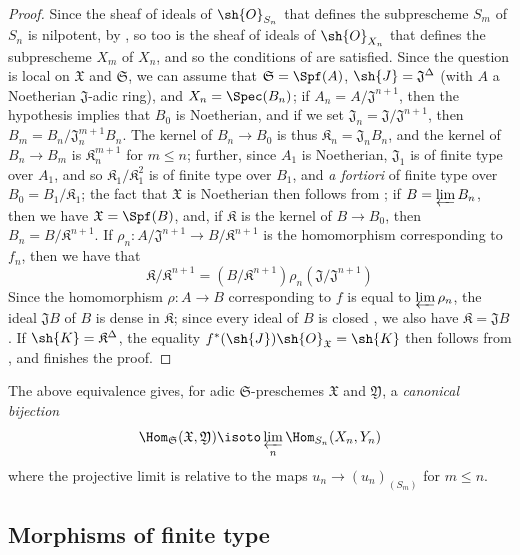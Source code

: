\begin{proof}
Since the sheaf of ideals of $\sh{O}_{S_n}$ that defines the subprescheme $S_m$ of $S_n$ is nilpotent, by , so too is the sheaf of ideals of $\sh{O}_{X_n}$ that defines the subprescheme $X_m$ of $X_n$, and so the conditions of  are satisfied.
Since the question is local on $\mathfrak{X}$ and $\mathfrak{S}$, we can assume that $\mathfrak{S}=\Spf(A)$, $\sh{J}=\mathfrak{J}^\Delta$ (with $A$ a Noetherian $\mathfrak{J}$-adic ring), and $X_n=\Spec(B_n)$;
if $A_n=A/\mathfrak{J}^{n+1}$, then the hypothesis implies that $B_0$ is Noetherian, and if we set $\mathfrak{J}_n=\mathfrak{J}/\mathfrak{J}^{n+1}$, then $B_m=B_n/\mathfrak{J}_n^{m+1}B_n$.
The kernel of $B_n\to B_0$ is thus $\mathfrak{K}_n=\mathfrak{J}_nB_n$, and the kernel of $B_n\to B_m$ is $\mathfrak{K}_n^{m+1}$ for $m\leq n$;
further, since $A_1$ is Noetherian, $\mathfrak{J}_1$ is of finite type over $A_1$, and so $\mathfrak{K}_1/\mathfrak{K}_1^2$ is of finite type over $B_1$, and \emph{a fortiori} of finite type over $B_0=B_1/\mathfrak{K}_1$;
the fact that $\mathfrak{X}$ is Noetherian then follows from ;
if $B=\varprojlim B_n$, then we have $\mathfrak{X}=\Spf(B)$, and, if $\mathfrak{K}$ is the kernel of $B\to B_0$, then $B_n=B/\mathfrak{K}^{n+1}$.
If $\rho_n:A/\mathfrak{J}^{n+1}\to B/\mathfrak{K}^{n+1}$ is the homomorphism corresponding to $f_n$, then we have that
\[
    \mathfrak{K}/\mathfrak{K}^{n+1} = (B/\mathfrak{K}^{n+1})\rho_n(\mathfrak{J}/\mathfrak{J}^{n+1})
\]
Since the homomorphism $\rho:A\to B$ corresponding to $f$ is equal to $\varprojlim\rho_n$, the ideal $\mathfrak{J}B$ of $B$ is dense in $\mathfrak{K}$; since every ideal of $B$ is closed , we also have $\mathfrak{K}=\mathfrak{J}B$.
If $\sh{K}=\mathfrak{K}^\Delta$, the equality $f^*(\sh{J})\sh{O}_\mathfrak{X}=\sh{K}$ then follows from , and finishes the proof.
\end{proof}

\begin{env}[10.12.3.2]
\label{I.10.12.3.2}
The above equivalence gives, for adic $\mathfrak{S}$-preschemes $\mathfrak{X}$ and $\mathfrak{Y}$, a \emph{canonical bijection}
\[
  \Hom_\mathfrak{S}(\mathfrak{X},\mathfrak{Y})\isoto\varprojlim_n\Hom_{S_n}(X_n,Y_n)
\]
where the projective limit is relative to the maps $u_n\to(u_n)_{(S_m)}$ for $m\leq n$.
\end{env}

\subsection{Morphisms of finite type}
\label{subsection:I.10.13}

